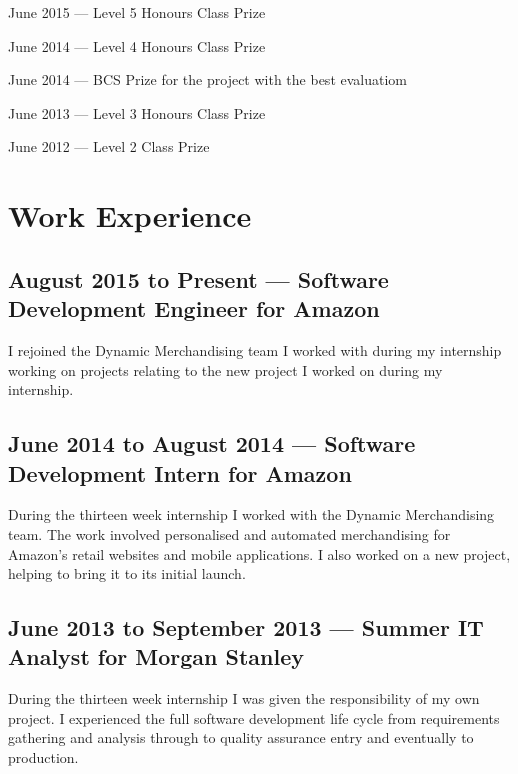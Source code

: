 \documentclass[11pt,a4paper]{article}
\begin{document}
June 2015 --- Level 5 Honours Class Prize

June 2014 --- Level 4 Honours Class Prize

June 2014 --- BCS Prize for the project with the best evaluatiom

June 2013 --- Level 3 Honours Class Prize

June 2012 --- Level 2 Class Prize

\section*{Work Experience}

\subsection*{August 2015 to Present --- Software Development Engineer for Amazon}

I rejoined the Dynamic Merchandising team I worked with during my internship
working on projects relating to the new project I worked on during my
internship.

\subsection*{June 2014 to August 2014 --- Software Development Intern for Amazon}

During the thirteen week internship I worked with the Dynamic Merchandising
team. The work involved personalised and automated merchandising for Amazon's
retail websites and mobile applications. I also worked on a new project, helping
to bring it to its initial launch.

\subsection*{June 2013 to September 2013 --- Summer IT Analyst for Morgan Stanley}

During the thirteen week internship I was given the responsibility of my own
project. I experienced the full software development life cycle from
requirements gathering and analysis through to quality assurance entry and
eventually to production.

\end{document}
